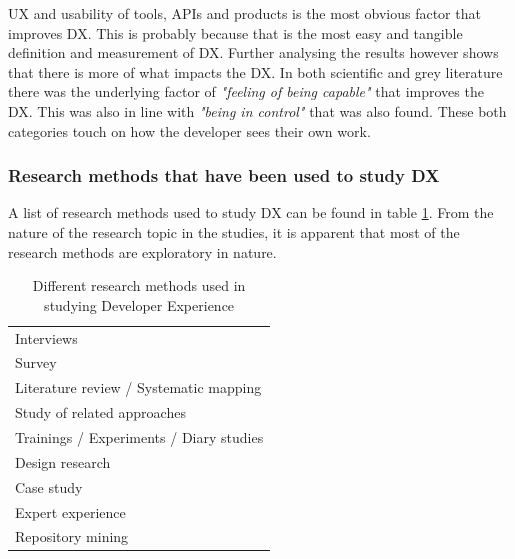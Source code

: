 \documentclass[english, 12pt, a4paper, sci, utf8, a-1b, online]{aaltothesis}
\newcounter{subsubsubsection}[subsubsection]
\begin{document}
UX and usability of tools, APIs and products is the most obvious factor that improves DX. This is probably because that is the most easy and tangible definition and measurement of DX.  Further analysing the results however shows that there is more of what impacts the DX. In both scientific and grey literature there was the underlying factor of \textit{"feeling of being capable"} that improves the DX. This was also in line with \textit{"being in control"} that was also found. These both categories touch on how the developer sees their own work.

\subsubsection{Research methods that have been used to study DX}

A list of research methods used to study DX can be found in table \ref{table:research-methods}. From the nature of the research topic in the studies, it is apparent that most of the research methods are exploratory in nature.

\begin{table}[ht]
  \begin{center}
    \begin{tabular}{l}
      \hline
      Interviews                              \\
      Survey                                  \\
      Literature review / Systematic mapping  \\
      Study of related approaches             \\
      Trainings / Experiments / Diary studies \\
      Design research                         \\
      Case study                              \\
      Expert experience                       \\
      Repository mining                       \\
      \hline
    \end{tabular}
    \captionsetup{width=0.6\textwidth}
    \caption{Different research methods used in studying Developer Experience}
    \label{table:research-methods}
  \end{center}
\end{table}

\end{document}
